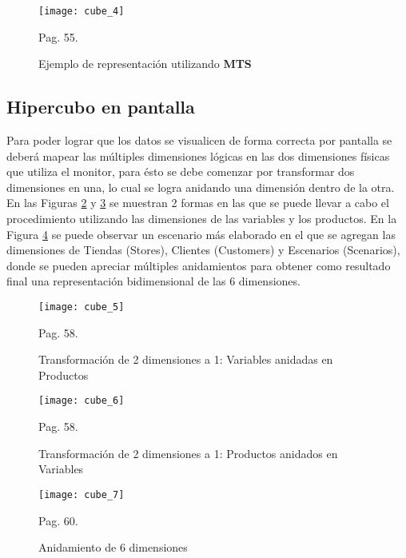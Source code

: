 \documentclass[a4paper,11pt]{article}
\begin{document}
\begin{flushleft}
    \begin{figure}
      \begin{center}
        \texttt{[image: cube\_4]}
        \caption{Ejemplo de representación utilizando \textbf{MTS}} \cite{olap_solutions} Pag. 55.
        \label{cube_4}
      \end{center}
    \end{figure}
    
    
    \subsection{Hipercubo en pantalla}
    
    Para poder lograr que los datos se visualicen de forma correcta por pantalla se deberá mapear las múltiples dimensiones lógicas en las dos dimensiones físicas
    que utiliza el monitor, para ésto se debe comenzar por transformar dos dimensiones en una, lo cual se logra anidando una dimensión dentro de la otra. En las
    Figuras \ref{cube_5} y \ref{cube_6} se muestran 2 formas en las que se puede llevar a cabo el procedimiento utilizando las dimensiones de las variables y los
    productos. En la Figura \ref{cube_7} se puede observar un escenario más elaborado en el que se agregan las dimensiones de Tiendas (Stores), Clientes
    (Customers) y Escenarios (Scenarios), donde se pueden apreciar múltiples anidamientos para obtener como resultado final una representación bidimensional de
    las 6 dimensiones.
    
    \begin{figure}
      \begin{center}
        \texttt{[image: cube\_5]}
        \caption{Transformación de 2 dimensiones a 1: Variables anidadas en Productos} \cite{olap_solutions} Pag. 58.
        \label{cube_5}
      \end{center}
    \end{figure}
    
    \begin{figure}
      \begin{center}
        \texttt{[image: cube\_6]}
        \caption{Transformación de 2 dimensiones a 1: Productos anidados en Variables} \cite{olap_solutions} Pag. 58.
        \label{cube_6}
      \end{center}
    \end{figure}
    
    \begin{figure}
      \begin{center}
        \texttt{[image: cube\_7]}
        \caption{Anidamiento de 6 dimensiones} \cite{olap_solutions} Pag. 60.
        \label{cube_7}
      \end{center}
    \end{figure}
    

\end{flushleft}
\end{document}

